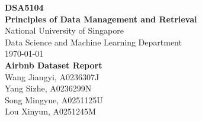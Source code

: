 \documentclass{article}
\begin{document}
	\begin{titlepage}
		\begin{center}
			\vspace*{1cm}
			\Large{\textbf{DSA5104}}\\
			\Large{\textbf{Principles of Data Management and Retrieval}}\\
			\vspace{1cm}
			\small
			National University of Singapore\\
			Data Science and Machine Learning Department\\
			\today \\
			\vfill
			\LARGE{\textbf{Airbnb Dataset Report}}\\[5mm]
			\vfill
			\small
			Wang Jiangyi, A0236307J\\
			Yang Sizhe, A0236299N\\
			Song Mingyue, A0251125U\\
			Lou Xinyun, A0251245M\\
		\end{center}
	\end{titlepage}
\end{document}
